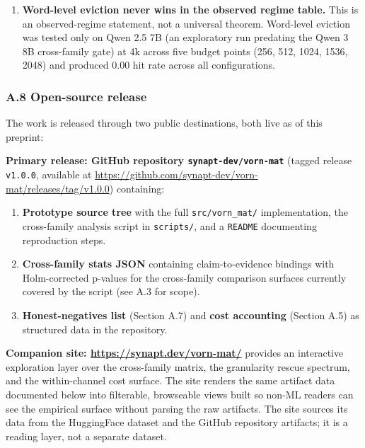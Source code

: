 \documentclass[
]{article}
\begin{document}
\begin{enumerate}
  \textbf{Partial MoE evidence.} Qwen 3 30B-A3B (MoE) vanilla
  recovered to 1.000 under no-thinking config (Appendix C.2);
  vorn-channel data confirms threshold-bounded sentence-vorn rescue at
  MoE scale (sentence-vorn 0.020→1.000 across b=256-2048).
  Attention-channel cells at b=1024 are VRAM-bounded (>80GB envelope),
  preventing direct attention-vs-vorn channel-favoritism
  classification at MoE scale. Full attention-channel MoE
  generalization is deferred.
\item
  \textbf{Word-level eviction never wins in the observed regime table.}
  This is an observed-regime statement, not a universal theorem.
  Word-level eviction was tested only on Qwen 2.5 7B (an exploratory run
  predating the Qwen 3 8B cross-family gate) at 4k across five budget
  points (256, 512, 1024, 1536, 2048) and produced 0.00 hit rate across
  all configurations.
\end{enumerate}

\subsubsection{A.8 Open-source release}\label{a8-open-source-release}

The work is released through two public destinations, both live as of
this preprint:

\textbf{Primary release: GitHub repository \texttt{synapt-dev/vorn-mat}}
(tagged release \texttt{v1.0.0}, available at
\href{https://github.com/synapt-dev/vorn-mat/releases/tag/v1.0.0}{\url{https://github.com/synapt-dev/vorn-mat/releases/tag/v1.0.0}})
containing:

\begin{enumerate}
\def\labelenumi{\arabic{enumi}.}
\item
  \textbf{Prototype source tree} with the full \texttt{src/vorn\_mat/}
  implementation, the cross-family analysis script in \texttt{scripts/},
  and a \texttt{README} documenting reproduction steps.
\item
  \textbf{Cross-family stats JSON} containing claim-to-evidence bindings
  with Holm-corrected p-values for the cross-family comparison surfaces
  currently covered by the script (see A.3 for scope).
\item
  \textbf{Honest-negatives list} (Section A.7) and \textbf{cost
  accounting} (Section A.5) as structured data in the repository.
\end{enumerate}

\textbf{Companion site:
\href{https://synapt.dev/vorn-mat/}{\url{https://synapt.dev/vorn-mat/}}}
provides an interactive exploration layer over the cross-family matrix,
the granularity rescue spectrum, and the within-channel cost surface.
The site renders the same artifact data documented below into
filterable, browseable views built so non-ML readers can see the
empirical surface without parsing the raw artifacts. The site sources
its data from the HuggingFace dataset and the GitHub repository
artifacts; it is a reading layer, not a separate dataset.
\end{document}
